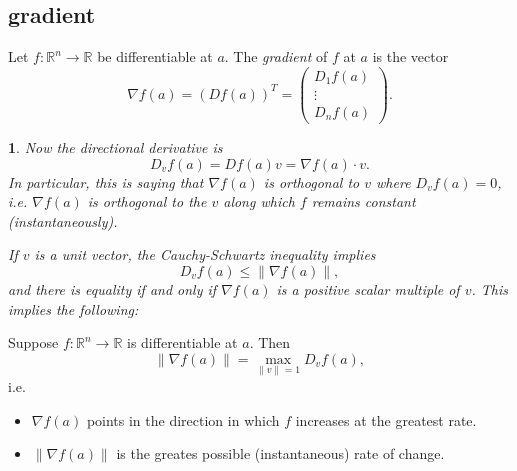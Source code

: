 \documentclass[12pt]{article}
\newtheorem{para}[theorem]{}
\begin{document}

\subsection{gradient} %

\begin{definition}
	Let $f:\mathbb{R}^n\to\mathbb{R}$ be differentiable at $a$. The \emph{gradient} of $f$ at $a$ is the vector 
	\begin{equation*}
		\nabla f(a) = (Df(a))^T = \begin{pmatrix} D_1f(a) \\ \vdots \\ D_nf(a) \end{pmatrix}.
	\end{equation*}
\end{definition}

\begin{para}
	Now the directional derivative is 
	\begin{equation*}
		D_vf(a)=Df(a)v=\nabla f(a)\cdot v.
	\end{equation*}
	In particular, this is saying that $\nabla f(a)$ is orthogonal to $v$ where $D_vf(a)=0$, i.e. $\nabla f(a)$ is orthogonal to the $v$ along which $f$ remains constant (instantaneously).

	If $v$ is a unit vector, the Cauchy-Schwartz inequality implies 
	\begin{equation*}
		D_vf(a) \leq \|\nabla f(a)\|,
	\end{equation*}
	and there is equality if and only if $\nabla f(a)$ is a positive scalar multiple of $v$. This implies the following:
\end{para}

\begin{proposition}
	Suppose $f:\mathbb{R}^n\to\mathbb{R}$ is differentiable at $a$. Then 
	\begin{equation*}
		\|\nabla f(a)\|=\max_{\|v\|=1}D_vf(a),
	\end{equation*}
	i.e. 
	\begin{itemize}
		\item $\nabla f(a)$ points in the direction in which $f$ increases at the greatest rate.
		\item $\|\nabla f(a)\|$ is the greates possible (instantaneous) rate of change.
	\end{itemize}
\end{proposition}

\end{document}
